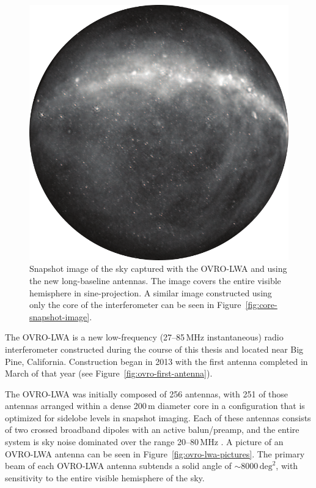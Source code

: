 \begin{bibunit}
\begin{figure}[t]
    \centering
    \includegraphics[width=\textwidth]{figures/chapter2/after-expansion}
    \caption{
        Snapshot image of the sky captured with the OVRO-LWA and using the new long-baseline
        antennas. The image covers the entire visible hemisphere in sine-projection.  A similar
        image constructed using only the core of the interferometer can be seen in
        Figure~\ref{fig:core-snapshot-image}.
    }
    \label{fig:expansion-snapshot-image}
\end{figure}

The OVRO-LWA is a new low-frequency (27--85\,MHz instantaneous) radio interferometer constructed
during the course of this thesis and located near Big Pine, California. Construction began in 2013
with the first antenna completed in March of that year (see Figure~\ref{fig:ovro-first-antenna}).

The OVRO-LWA was initially composed of 256 antennas, with 251 of those antennas arranged within a
dense 200\,m diameter core in a configuration that is optimized for sidelobe levels in snapshot
imaging.  Each of these antennas consists of two crossed broadband dipoles with an active
balun/preamp, and the entire system is sky noise dominated over the range 20--80\,MHz
\citep{2012PASP..124.1090H}.  A picture of an OVRO-LWA antenna can be seen in
Figure~\ref{fig:ovro-lwa-pictures}. The primary beam of each OVRO-LWA antenna subtends a solid angle
of $\sim 8000\,\text{deg}^2$, with sensitivity to the entire visible hemisphere of the sky.


\end{bibunit}

